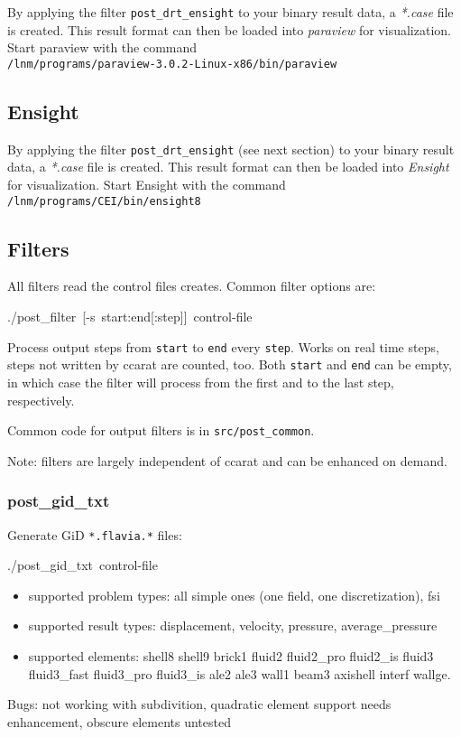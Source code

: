 By applying the filter \texttt{post\_drt\_ensight}
to your binary \baci{} result data, a \emph{*.case} file is created.
This result format can then be loaded into \emph{paraview} for visualization.
Start paraview with the command\\
\texttt{/lnm/programs/paraview-3.0.2-Linux-x86/bin/paraview}


\subsection{Ensight}

By applying the filter \texttt{post\_drt\_ensight} (see next section)
to your binary \baci{} result data, a \emph{*.case} file is created.
This result format can then be loaded into \emph{Ensight} for visualization.
Start Ensight with the command
\texttt{/lnm/programs/CEI/bin/ensight8}\\


\subsection{Filters}

All filters read the control files \ccarat{} creates. Common filter
options are:

\begin{lyxcode}
./post\_filter~{[}-s~start:end{[}:step]]~control-file
\end{lyxcode}
Process output steps from \texttt{start} to \texttt{end} every \texttt{step}.
Works on real time steps, steps not written by ccarat are counted,
too. Both \texttt{start} and \texttt{end} can be empty, in which case
the filter will process from the first and to the last step, respectively.

Common code for output filters is in \texttt{src/post\_common}.

Note: filters are largely independent of ccarat and can be enhanced
on demand.


\subsubsection{post\_gid\_txt}

Generate GiD \texttt{{*}.flavia.{*}} files:

\begin{lyxcode}
./post\_gid\_txt~control-file
\end{lyxcode}
\begin{itemize}
\item supported problem types: all simple ones (one field, one discretization),
fsi
\item supported result types: displacement, velocity, pressure, average\_pressure
\item supported elements: shell8 shell9 brick1 fluid2 fluid2\_pro fluid2\_is
fluid3 fluid3\_fast fluid3\_pro fluid3\_is ale2 ale3 wall1 beam3 axishell
interf wallge.
\end{itemize}
Bugs: not working with subdivition, quadratic element support needs
enhancement, obscure elements untested


